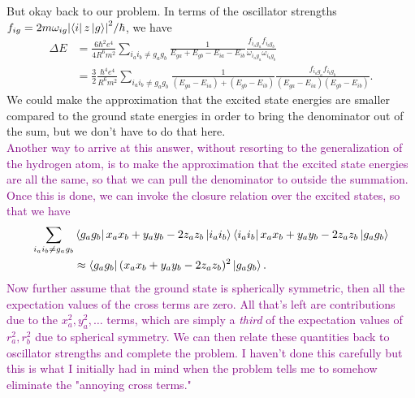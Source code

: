 \documentclass{article}
\theoremstyle{definition}
\newcommand{\f}[2]{\frac{#1}{#2}}
\begin{document}
\begin{enumerate}[label=(\alph*)]
But okay back to our problem. In terms of the oscillator strengths $f_{ig} = 2 m \omega_{ig} \abs{ \bra{i} z \ket{g}}^2 / \hbar $, we have
\begin{align*}
\Delta E 
&= \f{6\hbar^2  e^4 }{4 R^6 m^2 } \sum_{i_a i_b \neq g_a g_b} 
\f{1}{E_{ga} + E_{gb} - E_{ia} - E_{ib}} \f{ f_{i_a g_a} f_{i_bg_b}}{  \omega_{i_a g_a} \omega_{i_b g_b}} \\
&= \f{3}{2}\f{\hbar^4 e^4 }{R^6 m^2} \sum_{i_a i_b \neq g_a g_b} 
\f{1}{ (E_{ga} - E_{ia}) + (E_{gb} - E_{ib})} \f{ f_{i_a g_a} f_{i_bg_b}}{  (E_{ga} - E_{ia}) (E_{gb} - E_{ib})}.
\end{align*}
We could make the approximation that the excited state energies are smaller compared to the ground state energies in order to bring the denominator out of the sum, but we don't have to do that here. \\


\textcolor{purple}{Another way to arrive at this answer, without resorting to the generalization of the hydrogen atom, is to make the approximation that the excited state energies are all the same, so that we can pull the denominator to outside the summation. Once this is done, we can invoke the closure relation over the excited states, so that we have
\begin{align*}
\sum_{i_a i_b \neq g_a g_b}
&\bra{g_a g_b}  x_a x_b + y_a y_b - 2 z_a z_b   \ket{i_a i_b}   
 \bra{i_a i_b}  x_a x_b + y_a y_b - 2 z_a z_b  \ket{g_a g_b}   \\
&\approx \bra{g_a g_b} (x_a x_b + y_a y_b - 2z_a z_b)^2 \ket{g_a g_b}.
\end{align*}
Now further assume that the ground state is spherically symmetric, then all the expectation values of the cross terms are zero. All that's left are contributions due to the $x_a^2, y_a^2,\dots$ terms, which are simply a \textit{third} of the expectation values of $r^2_a, r_b^2$ due to spherical symmetry. We can then relate these quantities back to oscillator strengths and complete the problem. I haven't done this carefully but this is what I initially had in mind when the problem tells me to somehow eliminate the "annoying cross terms." 
}



\end{enumerate}
\end{document}
